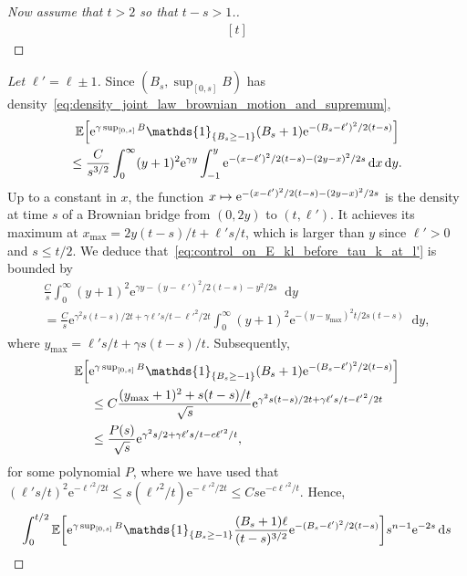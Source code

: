 \documentclass[AHL,Unicode,longabstracts,published]{cedram}
\newcommand{\e}{\mathrm{e}}
\renewcommand{\d}[1]{\mathop{}\!\mathrm{d}#1}
\newcommand{\E}{\mathbb{E}}
\newcommand\1{\mathds{1}}
\let\originalleft\left
\let\originalright\right
\renewcommand{\left}{\mathopen{}\mathclose\bgroup\originalleft}
\renewcommand{\right}{\aftergroup\egroup\originalright}
\let\oldmapsto\mapsto
\renewcommand*{\mapsto}{\mathchoice{\longmapsto}{\oldmapsto}{\oldmapsto}{\oldmapsto}}
\begin{document}
\begin{proofc}
\begin{proof}[{Now assume that $t > 2$ so that $t - s > 1$.}]
\begin{equation}
\begin{aligned}[t]
\end{aligned}
\end{equation}
\let\qed\relax
\end{proof}
\begin{proof}[{Let $\ell' = \ell \pm 1$}]
Since $(B_s, \sup_{[0, s]} B)$ has density~\eqref{eq:density_joint_law_brownian_motion_and_supremum},
\begin{multline}\label{eq:control_on_E_kl_before_tau_k_at_l'}
\E \left[\e^{\gamma \sup_{[0, s]} B} \1_{\{B_s \geq -1\}} (B_s + 1) \e^{-(B_s - \ell')^2/2(t-s)} \right] \\
\leq \frac{C}{s^{3/2}} \int_0^\infty (y + 1)^2 \e^{\gamma y} \int_{-1}^y \e^{-(x - \ell')^2/2(t-s) - (2y - x)^2/2s} \d{x} \d{y}. 
\end{multline}
Up to a constant in $x$, the function $x \mapsto \e^{-(x - \ell')^2/2(t-s) - (2y - x)^2/2s}$ is the density at time $s$ of a Brownian bridge from $(0, 2y)$ to $(t, \ell')$. It achieves its maximum at $x_{\max} = 2y (t-s)/t + \ell' s/t$, which is larger than $y$ since $\ell' > 0$ and $s \leq t/2$. We deduce that~\eqref{eq:control_on_E_kl_before_tau_k_at_l'} is bounded by
\begin{multline}
\frac{C}{s} \int_0^\infty (y + 1)^2 \e^{\gamma y - (y - \ell')^2/2(t-s) - y^2/2s} \d{y} \\
= \frac{C}{s} \e^{\gamma^2 s (t-s)/2t + \gamma \ell' s/t - {\ell'}^2/2t} \int_0^\infty (y + 1)^2 \e^{-(y - y_{\max})^2 t/2s(t-s)} \d{y},
\end{multline}
where $y_{\max} = \ell' s/t + \gamma s(t-s)/t$. Subsequently,
\begin{multline}
\E \left[\e^{\gamma \sup_{[0, s]} B} \1_{\{B_s \geq -1\}} (B_s + 1) \e^{-(B_s - \ell')^2/2(t-s)} \right]\\
\begin{aligned}
& \leq C \frac{(y_{\max} + 1)^2 + s(t-s)/t}{\sqrt{s}} \e^{\gamma^2 s (t-s)/2t + \gamma \ell' s/t - {\ell'}^2/2t}  \\
&\leq \frac{P(s)}{\sqrt{s}} \e^{\gamma^2 s/2 + \gamma \ell' s/t - c{\ell'}^2/t},
\end{aligned}
\end{multline}
for some polynomial $P$, where we have used that $(\ell' s/t)^2 \e^{-{\ell'}^2/2t} \leq s ({\ell'}^2/t) \e^{-{\ell'}^2/2t} \leq C s \e^{-c {\ell'}^2/t}$. Hence,
\begin{multline}\label{eq:bound_for_integral_of_I}
\int_0^{t/2} \E \left[\e^{\gamma \sup_{[0, s]} B} \1_{\{B_s \geq -1\}} \frac{(B_s + 1) \ell}{(t - s)^{3/2}} \e^{-(B_s - \ell')^2/2(t-s)} \right] s^{n - 1} \e^{-2s} \d{s} \\

\end{multline}
\end{proof}
\end{proofc}
\end{document}
